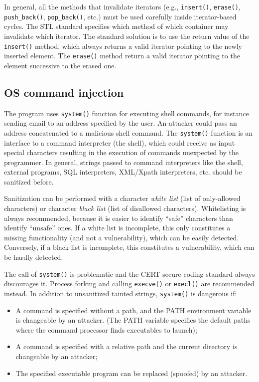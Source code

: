 \documentclass[a4paper,12pt]{article}
\begin{document}
In general, all the methods that invalidate iterators (e.g., \texttt{insert()}, \texttt{erase()}, \texttt{push\_back()}, \texttt{pop\_back()}, etc.) must be used carefully inside iterator-based cycles. The STL standard specifies which method of which container may invalidate which iterator. The standard solution is to use the return value of the \texttt{insert()} method, which always returns a valid iterator pointing to the newly inserted element. The \texttt{erase()} method return a valid iterator pointing to the element successive to the erased one.

\subsection{OS command injection}
The program uses \texttt{system()} function for executing shell commands, for instance sending email to an address specified by the user. An attacker could pass an address concatenated to a malicious shell command. The \texttt{system()} function is an interface to a command interpreter (the shell), which could receive as input special characters resulting in the execution of commands unexpected by the programmer. In general, strings passed to command interpreters like the shell, external programs, SQL interpreters, XML/Xpath interpreters, etc. should be sanitized before.


Sanitization can be performed with a character \textit{white list} (list of only-allowed characters) or character \textit{black list} (list of disallowed characters). Whitelisting is always recommended, because it is easier to identify “safe” characters than identify “unsafe” ones. If a white list is incomplete, this only constitutes a missing functionality (and not a vulnerability), which can be easily detected. Conversely, if a black list is incomplete, this constitutes a vulnerability, which can be hardly detected.

The call of \texttt{system()} is problematic and the CERT secure coding standard always discourages it. Process forking and calling \texttt{execve()} or \texttt{execl()} are recommended instead. In addition to unsanitized tainted strings, \texttt{system()} is dangerous if:
\begin{itemize}
	\item A command is specified without a path, and the PATH environment variable is changeable by an attacker. (The PATH variable specifies the default paths where the command processor finds executables to launch);
	\item A command is specified with a relative path and the current directory is changeable by an attacker;
	\item The specified executable program can be replaced (spoofed) by an attacker.
\end{itemize}
\end{document}

